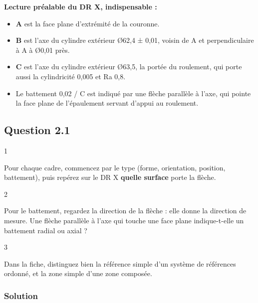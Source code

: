 \documentclass[11pt,a4paper]{article}
\providecommand{\tightlist}{\setlength{\itemsep}{0pt}\setlength{\parskip}{0pt}}
\begin{document}
\textbf{Lecture préalable du DR X, indispensable :}

\begin{itemize}
\tightlist
\item
  \textbf{A} est la face plane d'extrémité de la couronne.
\item
  \textbf{B} est l'axe du cylindre extérieur Ø62,4 ± 0,01, voisin de A et perpendiculaire à A à Ø0,01 près.
\item
  \textbf{C} est l'axe du cylindre extérieur Ø63,5, la portée du roulement, qui porte aussi la cylindricité 0,005 et Ra 0,8.
\item
  Le battement 0,02 / C est indiqué par une flèche parallèle à l'axe, qui pointe la face plane de l'épaulement servant d'appui au roulement.
\end{itemize}

\hypertarget{question-2.1}{%
\subsection{Question 2.1}\label{question-2.1}}

\begin{indication}{1}

Pour chaque cadre, commencez par le type (forme, orientation, position, battement), puis repérez sur le DR X \textbf{quelle surface} porte la flèche.

\end{indication}

\begin{indication}{2}

Pour le battement, regardez la direction de la flèche : elle donne la direction de mesure. Une flèche parallèle à l'axe qui touche une face plane indique-t-elle un battement radial ou axial ?

\end{indication}

\begin{indication}{3}

Dans la fiche, distinguez bien la référence simple d'un système de références ordonné, et la zone simple d'une zone composée.

\end{indication}

\hypertarget{solution-14}{%
\subsubsection{Solution}\label{solution-14}}
\end{document}
